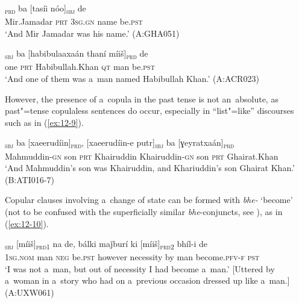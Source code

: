 \begin{exe}
\ex
\label{ex:12-7}
\gll [miirǰamadaár]\textsubscript{\textsc{prd}} ba [tasíi nóo]\textsubscript{\textsc{sbj}} de \\
Mir.Jamadar \textsc{prt} \textsc{3sg.gn} name be.\textsc{pst} \\
\glt `And Mir Jamadar was his name.' (A:GHA051)
\end{exe}
\begin{exe}
\ex
\label{ex:12-8}
\gll [áak]\textsubscript{\textsc{sbj}} ba [habibulaaxaán thaní míiš]\textsubscript{\textsc{prd}} de \\
one \textsc{prt} Habibullah.Khan \textsc{qt} man be.\textsc{pst} \\
\glt `And one of them was a~man named Habibullah Khan.' (A:ACR023)
\end{exe}

However, the presence of a~copula in the past tense is not an~absolute, as past"=tense copulaless sentences do occur, especially in ``list"=like'' discourses such as in (\ref{ex:12-9}).

\begin{exe}
\ex
\label{ex:12-9}
\textsubscript{\textsc{sbj}} ba [xaeerudíin]\textsubscript{\textsc{prd}}, \textsc{[}xaeerudíin-e putr]\textsubscript{\textsc{sbj}} ba [ɣeyratxaán]\textsubscript{\textsc{prd}} \\
Mahmuddin-\textsc{gn} son \textsc{prt} Khairuddin Khairuddin-\textsc{gn} son \textsc{prt} Ghairat.Khan \\
\glt `And Mahmuddin's son was Khairuddin, and Khariuddin's son Ghairat Khan.' (B:ATI016-7)
\end{exe}

Copular clauses involving a~change of state can be formed with \textit{bhe-} `become' (not to be confused with the superficially similar \textit{bhe}-conjuncts, see ), as in (\ref{ex:12-10}).

\begin{exe}
\ex
\label{ex:12-10}
\gll [ma]\textsubscript{\textsc{sbj}} [míiš]\textsubscript{\textsc{prd1}} na de, bálki maǰburí ki [míiš]\textsubscript{\textsc{prd2}} bhíl-i de \\
\textsc{1sg.nom} man \textsc{neg} be.\textsc{pst}  however necessity by man become.\textsc{pfv-f} \textsc{pst} \\
\glt `I was not a~man, but out of necessity I had become a~man.' [Uttered by a~woman in a~story who had on a~previous occasion dressed up like a~man.] (A:UXW061)
\end{exe}

